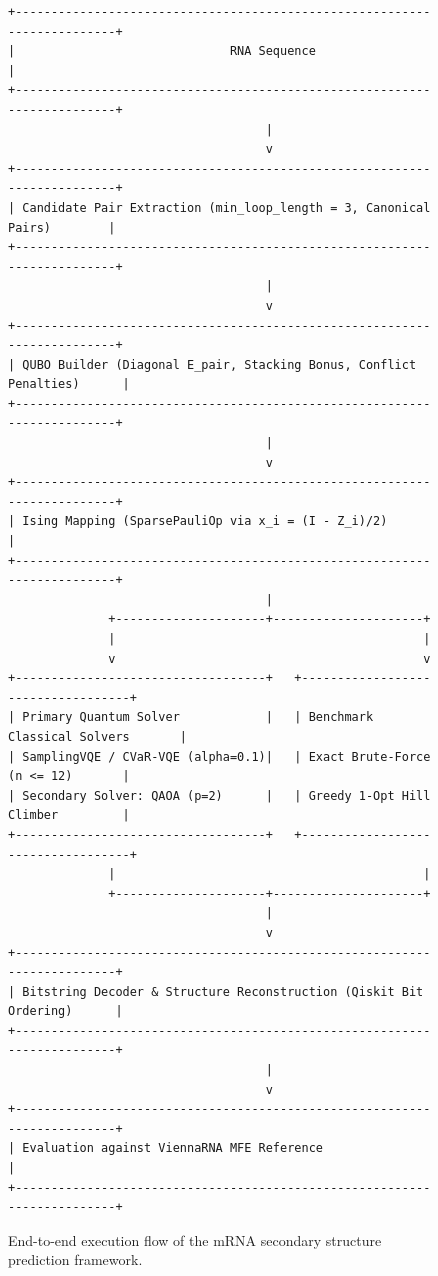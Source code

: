 \documentclass[11pt,a4paper]{article}
\begin{document}
	\begin{figure}[htbp]
		\centering
		\small
		\begin{verbatim}
+-------------------------------------------------------------------------+
|                              RNA Sequence                               |
+-------------------------------------------------------------------------+
                                    |
                                    v
+-------------------------------------------------------------------------+
| Candidate Pair Extraction (min_loop_length = 3, Canonical Pairs)        |
+-------------------------------------------------------------------------+
                                    |
                                    v
+-------------------------------------------------------------------------+
| QUBO Builder (Diagonal E_pair, Stacking Bonus, Conflict Penalties)      |
+-------------------------------------------------------------------------+
                                    |
                                    v
+-------------------------------------------------------------------------+
| Ising Mapping (SparsePauliOp via x_i = (I - Z_i)/2)                     |
+-------------------------------------------------------------------------+
                                    |
              +---------------------+---------------------+
              |                                           |
              v                                           v
+-----------------------------------+   +-----------------------------------+
| Primary Quantum Solver            |   | Benchmark Classical Solvers       |
| SamplingVQE / CVaR-VQE (alpha=0.1)|   | Exact Brute-Force (n <= 12)       |
| Secondary Solver: QAOA (p=2)      |   | Greedy 1-Opt Hill Climber         |
+-----------------------------------+   +-----------------------------------+
              |                                           |
              +---------------------+---------------------+
                                    |
                                    v
+-------------------------------------------------------------------------+
| Bitstring Decoder & Structure Reconstruction (Qiskit Bit Ordering)      |
+-------------------------------------------------------------------------+
                                    |
                                    v
+-------------------------------------------------------------------------+
| Evaluation against ViennaRNA MFE Reference                             |
+-------------------------------------------------------------------------+
		\end{verbatim}
		\caption{End-to-end execution flow of the mRNA secondary structure prediction framework.}
		\label{fig:pipeline_flow}
	\end{figure}
	
\end{document}
